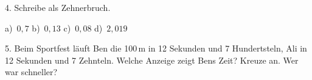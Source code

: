 \documentclass[11pt]{article}
\begin{document}
\begin{pfaufg}{}{4.}{}
Schreibe als Zehnerbruch. \par\vspace{3pt} a)~$0{,}7$ \qquad b)~$0{,}13$ \qquad c)~$0{,}08$ \qquad d)~$2{,}019$
\end{pfaufg}

\begin{pfaufg}{}{5.}{}
Beim Sportfest läuft Ben die 100\,m in 12 Sekunden und 7 Hundertsteln, Ali in 12 Sekunden und 7 Zehnteln. Welche Anzeige zeigt Bens Zeit? Kreuze an. Wer war schneller?\par\smallskip {}\par {}
\end{pfaufg}
\end{document}
